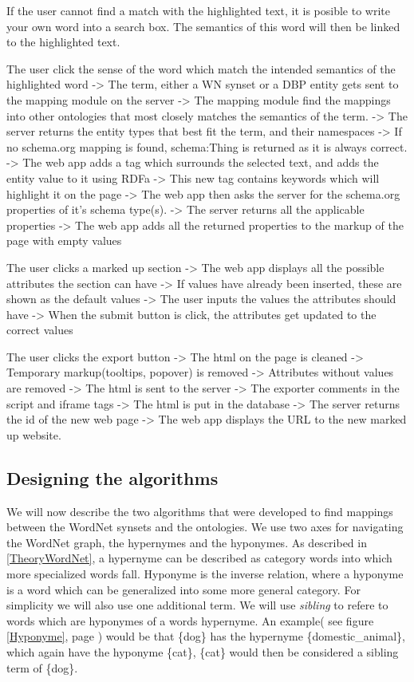	If the user cannot find a match with the highlighted text, 
	it is posible to write your own word into a search box. 
	The semantics of this word will then be linked to the highlighted text.

The user click the sense of the word which match the intended semantics of the highlighted word
	-> The term, either a WN synset or a DBP entity gets sent to the mapping module on the server
	-> The mapping module find the mappings into other ontologies 
		that most closely matches the semantics of the term.
	-> The server returns the entity types that best fit the term, and their namespaces
		-> If no schema.org mapping is found, schema:Thing is returned as it is always correct.
	-> The web app adds a tag which surrounds the selected text, and adds the entity value to it using RDFa
		-> This new tag contains keywords which will highlight it on the page
	-> The web app then asks the server for the schema.org properties of it's schema type(s).
	-> The server returns all the applicable properties
	-> The web app adds all the returned properties to the markup of the page with empty values

The user clicks a marked up section
	-> The web app displays all the possible attributes the section can have
		-> If values have already been inserted, these are shown as the default values
	-> The user inputs the values the attributes should have
	-> When the submit button is click, the attributes get updated to the correct values

The user clicks the export button
	-> The html on the page is cleaned
		-> Temporary markup(tooltips, popover) is removed
		-> Attributes without values are removed
	-> The html is sent to the server
		-> The exporter comments in the script and iframe tags
		-> The html is put in the database
	-> The server returns the id of the new web page
	-> The web app displays the URL to the new marked up website. 

\subsection{Designing the algorithms}
We will now describe the two algorithms that were developed to find mappings between the WordNet synsets and the ontologies.
We use two axes for navigating the WordNet graph, the hypernymes and the hyponymes.
As described in \ref{TheoryWordNet}, a hypernyme can be described as category words into which more specialized words fall.
Hyponyme is the inverse relation, where a hyponyme is a word which can be generalized into some more general category.
For simplicity we will also use one additional term. 
We will use \emph{sibling} to refere to words which are hyponymes of a words hypernyme. 
An example( see figure \ref{Hyponyme}, page \pageref{Hyponyme}) 
would be that \{dog\} has the hypernyme \{domestic\_animal\}, which again have the hyponyme \{cat\},
\{cat\} would then be considered a sibling term of \{dog\}.


